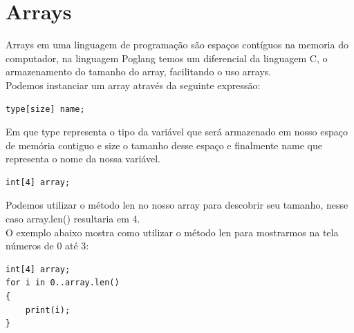 \documentclass[12pt, letterpaper]{article}
\newcommand\tab[1][1cm]{\hspace*{#1}}
\begin{document}
\begin{spacing}{1.5}
\end{spacing}

\section{Arrays}
\tab Arrays em uma linguagem de programação são espaços contíguos na memoria
do computador, na linguagem Poglang temos um diferencial da linguagem C, 
o armazenamento do tamanho do array, facilitando o 
uso arrays.\\[1.0mm]

\tab Podemos instanciar um array através da seguinte expressão:

\begin{spacing}{1.5}
\end{spacing}

\begin{lstlisting}[caption=Forma geral do array]
type[size] name;
\end{lstlisting}

\begin{spacing}{1.5}
\end{spacing}

\tab Em que type representa o tipo da variável que será armazenado em nosso espaço
de memória contiguo e size o tamanho desse espaço e finalmente name que representa 
o nome da nossa variável.\\[1.0mm]

\begin{spacing}{1.5}
\end{spacing}

\begin{lstlisting}[caption=Exemplo de declaração de um array]
int[4] array;
\end{lstlisting}

\begin{spacing}{1.5}
\end{spacing}

\tab Podemos utilizar o método len no nosso array para descobrir seu tamanho,
nesse caso array.len() resultaria em 4.\\[1.0mm]
\tab O exemplo abaixo mostra como utilizar o método len para mostrarmos na tela
números de 0 até 3:

\begin{spacing}{1.5}
\end{spacing}

\begin{lstlisting}[caption=Exemplo uso do for para um array]
int[4] array;
for i in 0..array.len() 
{
    print(i);
}
\end{lstlisting}
\end{document}
